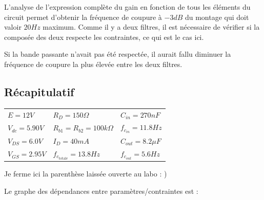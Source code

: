\documentclass[11pt,a4paper]{article}
\theoremstyle{definition}%
\begin{document}
{L'analyse de l'expression complète du gain en fonction de tous les éléments du circuit permet d'obtenir la fréquence de coupure à $-3dB$ du montage qui doit valoir $20Hz$ maximum. Comme il y a deux filtres, il est nécessaire de vérifier si la composée des deux respecte les contraintes, ce qui est le cas ici.

Si la bande passante n'avait pas été respectée, il aurait fallu diminuer la fréquence de coupure la plus élevée entre les deux filtres.


\subsection{Récapitulatif}

\begin{center}
\begin{tabular}{lll}
$E=12V$ & $R_D=150\Omega$ & $C_{in}=270nF$ \\ 
$V_{dc}=5.90V$ & $R_{b1}=R_{b2}=100 k\Omega$ & $f_{c_{in}}=11.8Hz$ \\ 
$V_{DS}=6.0V$ & $I_D=40mA$ & $C_{out}=8.2\mu F$ \\ 
$V_{GS}=2.95V$ & $f_{c_{\mbox{totale}}}=13.8Hz$ & $f_{c_{out}}=5.6Hz$ \\ 
\end{tabular} 

\end{center}

{\color{white}Je ferme ici la parenthèse laissée ouverte au labo  : )}

Le graphe des dépendances entre paramètres/contraintes est :

}
\end{document}
